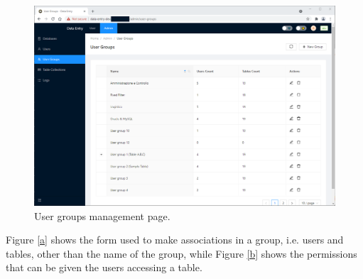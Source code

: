 \begin{figure}[!htb]
    \centering
    \includegraphics[width=15.8cm]{chapters/images/ch_3/FE/Admin/user_group.png}
    \caption{User groups management page.}
    \label{fig:userGroup}
\end{figure}

Figure \ref{a} shows the form used to make associations in a group, i.e. users and tables, other than the name of the group, while Figure \ref{b} shows the permissions that can be given the users accessing a table.

